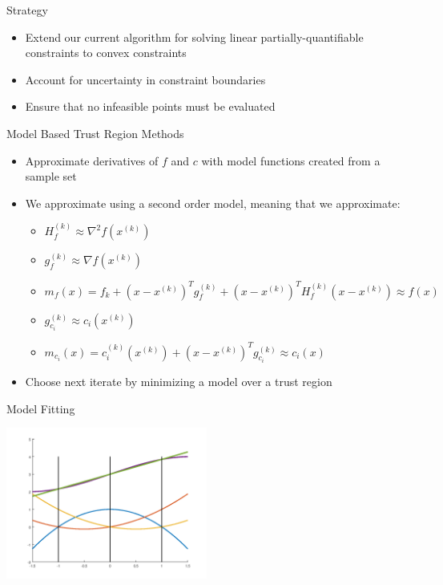 \documentclass{beamer}
\newcommand{\xk}{{{x}^{(k)}}}
\newcommand{\mk}{{m_f}}
\newcommand{\fk}{{f_k}}
\newcommand{\fgk}{{g^{(k)}_f}}
\newcommand{\fhk}{{H^{(k)}_f}}
\newcommand{\ck}{{c^{(k)}_{i}(\xk)}}
\newcommand{\cgk}{{g^{(k)}_{c_i}}}
\newcommand{\mck}{{m_{c_i}}}
\begin{document}
\begin{frame}{Strategy}
    \begin{itemize}
        \item Extend our current algorithm for solving linear partially-quantifiable constraints to convex constraints
        \item Account for uncertainty in constraint boundaries
        \item Ensure that no infeasible points must be evaluated
    \end{itemize}
\end{frame}





\begin{frame}{Model Based Trust Region Methods}
    \begin{itemize}
        \setlength\itemsep{2em}
    	\item Approximate derivatives of $f$ and $c$ with model functions created from a sample set
    	\item We approximate using a second order model, meaning that we approximate:
    	\begin{itemize}
            \item $\fhk \approx \nabla ^2 f(\xk)$
            \item $\fgk \approx \nabla f(\xk)$
            \item $\mk(x) = \fk + \left(x - \xk \right)^T\fgk + \left(x - \xk \right)^T\fhk\left(x - \xk \right) \approx f(x)$
            \item $\cgk \approx c_i(\xk)$
            \item $\mck(x) = \ck + \left(x - \xk\right)^T\cgk \approx c_i(x)$
    	\end{itemize}
	    \item Choose next iterate by minimizing a model over a trust region
	\end{itemize}
\end{frame}


\begin{frame}{Model Fitting}
	\begin{center}
		\includegraphics[width=250px]{images/lagrange_polynomials.png}
	\end{center}
\end{frame}
\end{document}
